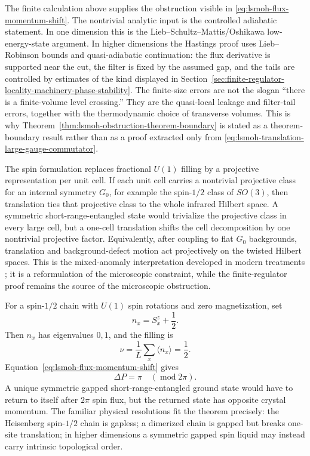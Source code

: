 The finite calculation above supplies the obstruction visible in
\eqref{eq:lsmoh-flux-momentum-shift}.  The nontrivial analytic input is the
controlled adiabatic statement.  In one dimension this is the
Lieb--Schultz--Mattis/Oshikawa low-energy-state argument.  In higher dimensions
the Hastings proof uses Lieb--Robinson bounds and quasi-adiabatic continuation:
the flux derivative is supported near the cut, the filter is fixed by the
assumed gap, and the tails are controlled by estimates of the kind displayed in
Section~\ref{sec:finite-regulator-locality-machinery-phase-stability}.  The
finite-size errors are not the slogan ``there is a finite-volume level
crossing.''  They are the quasi-local leakage and filter-tail errors, together
with the thermodynamic choice of transverse volumes.  This is why
Theorem~\ref{thm:lsmoh-obstruction-theorem-boundary} is stated as a
theorem-boundary result rather than as a proof extracted only from
\eqref{eq:lsmoh-translation-large-gauge-commutator}.

The spin formulation replaces fractional \(U(1)\) filling by a projective
representation per unit cell.  If each unit cell carries a nontrivial projective
class for an internal symmetry \(G_0\), for example the spin-\(1/2\) class of
\(SO(3)\), then translation ties that projective class to the whole infrared
Hilbert space.  A symmetric short-range-entangled state would trivialize the
projective class in every large cell, but a one-cell translation shifts the
cell decomposition by one nontrivial projective factor.  Equivalently, after
coupling to flat \(G_0\) backgrounds, translation and background-defect motion
act projectively on the twisted Hilbert spaces.  This is the mixed-anomaly
interpretation developed in modern treatments
\cite{MetlitskiThorngren2018Anomalies,ElseThorngren2020LSMTopological,
ChengSeiberg2023LSMLuttingerAnomaly}; it is a reformulation of the microscopic
constraint, while the finite-regulator proof remains the source of the
microscopic obstruction.

For a spin-\(1/2\) chain with \(U(1)\) spin rotations and zero magnetization,
set
\[
  n_x=S_x^z+\frac12 .
\]
Then \(n_x\) has eigenvalues \(0,1\), and the filling is
\[
  \nu=\frac{1}{L}\sum_x\langle n_x\rangle=\frac12 .
\]
Equation~\eqref{eq:lsmoh-flux-momentum-shift} gives
\[
  \Delta P=\pi\quad(\operatorname{mod}2\pi).
\]
A unique symmetric gapped short-range-entangled ground state would have to
return to itself after \(2\pi\) spin flux, but the returned state has opposite
crystal momentum.  The familiar physical resolutions fit the theorem precisely:
the Heisenberg spin-\(1/2\) chain is gapless; a dimerized chain is gapped but
breaks one-site translation; in higher dimensions a symmetric gapped spin
liquid may instead carry intrinsic topological order.


